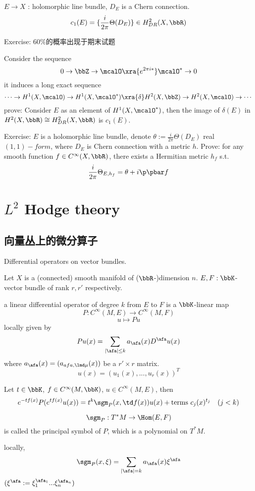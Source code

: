 $E\to X$ : holomorphic line bundle, $D_E$ is a Chern connection.
$$c_1(E)=\{\frac{i}{2\pi}\Theta(D_E)\}\in H_{DR}^2(X,\bbR)$$

Exercise:
{\color{red} $60\%$的概率出现于期末试题}

Consider the sequence
$$0\to\bbZ\to\mcalO\xra{e^{2\pi i *}}\mcalO^*\to 0$$
it induces a long exact sequence
$$\cdots\to
H^1(X,\mcalO)\to H^1(X,\mcalO^*)\xra{\delta}H^2(X,\bbZ)\to H^2(X,\mcalO)\to\cdots
$$
prove: Consider $E$ as an element of $H^1(X,\mcalO^*)$, then the
image of $\delta(E)$ in $H^2(X,\bbR)\cong H^2_{DR}(X,\bbR)$ is $c_1(E)$.

Exercise: $E$ is a holomorphic line bundle, denote
$\theta:=\frac{i}{2\pi}\Theta(D_E)$ real $(1,1)-form$,
where $D_E$ is Chern connection
with a metric $h$.
Prove: for any smooth function $f\in C^\infty(X,\bbR)$,
there exists a Hermitian metric $h_f$ s.t.
$$\frac{i}{2\pi}\Theta_{E,h_f}=\theta+i\p\pbar f$$

\chapter{$L^2$ Hodge theory}

\section{向量丛上的微分算子}
Differential operators on vector bundles.

Let $X$ is a (connected) smooth manifold of ($\bbR$-)dimension $n$.
$E,F:\bbK$-vector bundle of rank $r,r'$ respectively.

\begin{definition}
a linear differential operator of degree $k$ from $E$ to $F$ is a $\bbK$-linear map
$$P:C^\infty(M,E)\to C^\infty(M,F)$$
$$u\mapsto Pu$$
locally given by
$$Pu(x)=\sum_{|\afa|\leq k}a_{\afa}(x)D^\afa u(x)$$
where $a_\afa(x)=(a_{afa,\lmd\mu}(x))$ be a $r'\times r$ matrix.
$$
u(x)=(u_1(x),...,u_r(x))^T
$$
\end{definition}

Let $t\in\bbK$, $f\in C^\infty(M,\bbK)$, $u\in C^\infty(M,E)$,
then
$$e^{-tf(x)}P(e^{tf(x)}u(x))=
t^k\sgm_P(x,\td f(x))u(x)+\text{terms } c_j(x)^{t_j}\quad(j<k)$$
\begin{definition}
$$\sgm_P:T^*M\to\Hom(E,F)$$
is called the principal symbol of $P$, which is a polynomial on $T^*M$.
\end{definition}
locally,
$$\sgm_P(x,\xi)=\sum_{|\afa|=k}a_\afa(x)\xi^\afa$$
$(\xi^\afa:=\xi_1^{\afa_1}...\xi_n^{\afa_n})$

